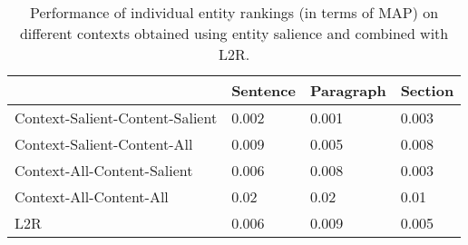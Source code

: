 \begin{table*}[t]
\caption{Performance of individual entity rankings (in terms of MAP) on different contexts obtained using entity salience and combined with L2R.}
\label{tab:Results-Entity-Rankings-Sal}
\begin{tabular}{@{}llll@{}}
\toprule
                                & Sentence & Paragraph & Section \\ \midrule
Context-Salient-Content-Salient & 0.002    & 0.001     & 0.003   \\
Context-Salient-Content-All     & 0.009    & 0.005     & 0.008   \\
Context-All-Content-Salient     & 0.006    & 0.008     & 0.003   \\
Context-All-Content-All         & 0.02     & 0.02      & 0.01    \\ \midrule
L2R                             & 0.006    & 0.009     & 0.005   \\ \bottomrule
\end{tabular}
\end{table*}